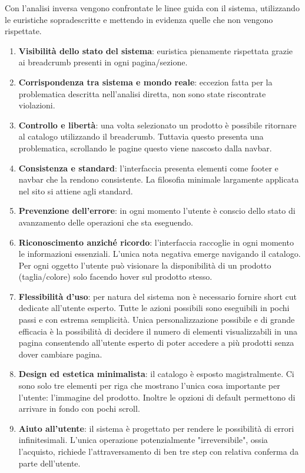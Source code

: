 \documentclass[12pt,italian,]{report}
\providecommand{\tightlist}{%
  \setlength{\itemsep}{0pt}\setlength{\parskip}{0pt}}
\begin{document}
Con l'analisi inversa vengono confrontate le linee guida con il sistema, utilizzando le euristiche sopradescritte e mettendo in evidenza quelle che non vengono rispettate.
\begin{enumerate}
\def\labelenumi{\arabic{enumi}.}
\tightlist
\item
  \textbf{Visibilità dello stato del sistema}: euristica pienamente rispettata grazie ai breadcrumb presenti in ogni pagina/sezione.
\item
  \textbf{Corrispondenza tra sistema e mondo reale}: eccezion fatta per la problematica descritta nell'analisi diretta, non sono state riscontrate violazioni.
\item
  \textbf{Controllo e libertà}: una volta selezionato un prodotto è possibile ritornare al catalogo utilizzando il breadcrumb. Tuttavia questo presenta una problematica, scrollando le pagine questo viene nascosto dalla navbar.
\item
  \textbf{Consistenza e standard}: l'interfaccia presenta elementi come footer e navbar che la rendono consistente. La filosofia minimale largamente applicata nel sito si attiene agli standard.
\item
  \textbf{Prevenzione dell'errore}: in ogni momento l'utente è conscio dello stato di avanzamento delle operazioni che sta eseguendo. 
\item
  \textbf{Riconoscimento anziché ricordo}: l'interfaccia raccoglie in ogni momento le informazioni essenziali. L'unica nota negativa emerge navigando il catalogo. Per ogni oggetto l'utente può visionare la disponibilità di un prodotto (taglia/colore) solo facendo hover sul prodotto stesso.
\item
  \textbf{Flessibilità d'uso}: per natura del sistema non è necessario fornire short cut dedicate all'utente esperto. Tutte le azioni possibili sono eseguibili in pochi passi e con estrema semplicità. Unica personalizzazione possibile e di grande efficacia è la possibilità di decidere il numero di elementi visualizzabili in una pagina consentendo all'utente esperto di poter accedere a più prodotti senza dover cambiare pagina.
\item
  \textbf{Design ed estetica minimalista}: il catalogo è esposto magistralmente. Ci sono solo tre elementi per riga che mostrano l'unica cosa importante per l'utente: l'immagine del prodotto. Inoltre le opzioni di default permettono di arrivare in fondo con pochi scroll. 
\item
  \textbf{Aiuto all'utente}: il sistema è progettato per rendere le possibilità di errori infinitesimali. L'unica operazione potenzialmente "irreversibile", ossia l'acquisto, richiede l'attraversamento di ben tre step con relativa conferma da parte dell'utente. 

\end{enumerate}
\end{document}
